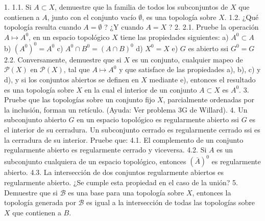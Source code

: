 \documentclass[a4paper, 12pt]{article}
\begin{document}
\begin{problema}
    1.
1.1. Si $A \subset X$, demuestre que la familia de todos los subconjuntos de $X$ que contienen a $A$, junto con el conjunto vacío $\emptyset$, es una topología sobre $X$.
1.2. ¿Qué topología resulta cuando $A=\emptyset$ ? ¿Y cuando $A=X$ ?
2.
2.1. Pruebe la operación $A \mapsto A^0$, en un espacio topológico $X$ tiene las propiedades siguientes:
a) $A^0 \subset A$
b) $\left(A^0\right)^0=A^0$
c) $A^0 \cap B^0=(A \cap B)^0$
d) $X^0=X$
e) $G$ es abierto ssi $G^0=G$
2.2. Conversamente, demuestre que si $X$ es un conjunto, cualquier mapeo de $\mathcal{P}(X)$ en $\mathcal{P}(X)$, tal que $A \mapsto A^0$ y que satisface de las propiedades a), b), c) y d), y si los conjuntos abiertos se definen en $X$ mediante e), entonces el resultado es una topología sobre $X$ en la cual el interior de un conjunto $A \subset X$ es $A^0$.
3. Pruebe que las topologías sobre un conjunto fijo $X$, parcialmente ordenadas por la inclusión, forman un retículo.
(Ayuda: Ver problema 3G de Willard).
4. Un subconjunto abierto $G$ en un espacio topológico es regularmente abierto ssi $G$ es el interior de su cerradura. Un subconjunto cerrado es regularmente cerrado ssi es la cerradura de su interior. Pruebe que:
4.1. El complemento de un conjunto regularmente abierto es regularmente cerrado y viceversa.
4.2. Si $A$ es un subconjunto cualquiera de un espacio topológico, entonces $(\bar{A})^0$ es regularmente abierto.
4.3. La intersección de dos conjuntos regularmente abiertos es regularmente abierto. ¿Se cumple esta propiedad en el caso de la unión?
5. Demuestre que si $\mathcal{B}$ es una base para una topología sobre $X$, entonces la topología generada por $\mathcal{B}$ es igual a la intersección de todas las topologías sobre $X$ que contienen a $B$.
\end{problema}









\newpage
\end{document}
